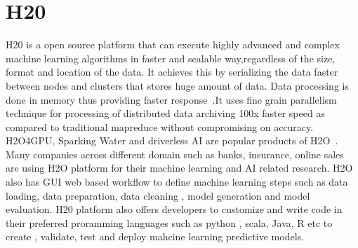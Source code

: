 \section{H20}


H20 is a open source platform that can execute highly advanced 
and complex machine learning algorithms in faster and scalable 
way,regardless of the size, format and location of the 
data. It achieves this by serializing 
the data faster between nodes and clusters that stores huge amount 
of data. Data processing is done in memory thus providing faster 
response~\cite{hid-sp18-523-www-h2o}.It uses fine grain parallelism 
technique for processing of distributed data archiving 100x faster 
speed as compared to traditional mapreduce without compromising 
on accuracy. H2O4GPU, Sparking Water and driverless AI are popular 
products of H2O~\cite{hid-sp18-523-www-h2o}. Many companies
across different domain such as banks, insurance, online sales 
are using H2O platform for their machine learning and AI related
research. H2O also has GUI web based workflow to define machine
learning steps such as data loading, data preparation, data cleaning
, model generation and model evaluation. H20 platform also offers
developers to customize and write code in their preferred proramming
languages such as python , scala, Java, R etc to create , validate,
test and deploy mahcine learning predictive models.





